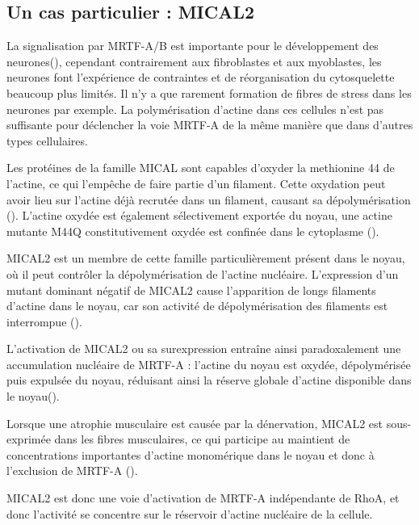 \documentclass{report}
\begin{document}
\subsection{Un cas particulier : MICAL2}

La signalisation par MRTF-A/B est importante pour le développement des neurones(\cite{kalita_mkls:_2012}), cependant contrairement aux fibroblastes et aux myoblastes, les neurones font l'expérience de contraintes et de réorganisation du cytosquelette beaucoup plus limités. Il n'y a que rarement formation de fibres de stress dans les neurones par exemple. La polymérisation d'actine dans ces cellules n'est pas suffisante pour déclencher la voie MRTF-A de la même manière que dans d'autres types cellulaires. 

Les protéines de la famille MICAL sont capables d'oxyder la methionine 44 de l'actine, ce qui l'empêche de faire partie d'un filament. Cette oxydation peut avoir lieu sur l'actine déjà recrutée dans un filament, causant sa dépolymérisation (\cite{hung_direct_2011}). L'actine oxydée est également sélectivement exportée du noyau, une actine mutante M44Q constitutivement oxydée est confinée dans le cytoplasme (\cite{lundquist_redox_2014}).

MICAL2 est un membre de cette famille particulièrement présent dans le noyau, où il peut contrôler la dépolymérisation de l'actine nucléaire. L'expression d'un mutant dominant négatif de MICAL2 cause l'apparition de longs filaments d'actine dans le noyau, car son activité de dépolymérisation des filaments est interrompue (\cite{lundquist_redox_2014}). 

L'activation de MICAL2 ou sa surexpression entraîne ainsi paradoxalement une accumulation nucléaire de MRTF-A : l'actine du noyau est oxydée, dépolymérisée puis expulsée du noyau, réduisant ainsi la réserve globale d'actine disponible dans le noyau(\cite{lundquist_redox_2014}). 

Lorsque une atrophie musculaire est causée par la dénervation, MICAL2 est sous-exprimée dans les fibres musculaires, ce qui participe au maintient de concentrations importantes d'actine monomérique dans le noyau et donc à l'exclusion de MRTF-A (\cite{collard_nuclear_2014}). 

MICAL2 est donc une voie d'activation de MRTF-A indépendante de RhoA, et donc l'activité se concentre sur le réservoir d'actine nucléaire de la cellule. 


\end{document}
